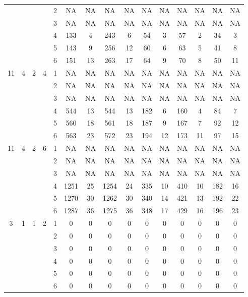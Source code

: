 \begin{longtable}{|c|c|c|c|c|c c|c c|c c|c c|c c|}
 & & & & 2 & NA & NA & NA & NA & NA & NA & NA & NA & NA & NA \\
 & & & & 3 & NA & NA & NA & NA & NA & NA & NA & NA & NA & NA \\
 & & & & 4 & 133 & 4 & 243 & 6 & 54 & 3 & 57 & 2 & 34 & 3 \\
 & & & & 5 & 143 & 9 & 256 & 12 & 60 & 6 & 63 & 5 & 41 & 8 \\
 & & & & 6 & 151 & 13 & 263 & 17 & 64 & 9 & 70 & 8 & 50 & 11 \\
\hline
\multirow{6}{*}{11} & \multirow{6}{*}{4} & \multirow{6}{*}{2} & \multirow{6}{*}{4} & 1 & NA & NA & NA & NA & NA & NA & NA & NA & NA & NA \\
 & & & & 2 & NA & NA & NA & NA & NA & NA & NA & NA & NA & NA \\
 & & & & 3 & NA & NA & NA & NA & NA & NA & NA & NA & NA & NA \\
 & & & & 4 & 544 & 13 & 544 & 13 & 182 & 6 & 160 & 4 & 84 & 7 \\
 & & & & 5 & 560 & 18 & 561 & 18 & 187 & 9 & 167 & 7 & 92 & 12 \\
 & & & & 6 & 563 & 23 & 572 & 23 & 194 & 12 & 173 & 11 & 97 & 15 \\
\hline
\multirow{6}{*}{11} & \multirow{6}{*}{4} & \multirow{6}{*}{2} & \multirow{6}{*}{6} & 1 & NA & NA & NA & NA & NA & NA & NA & NA & NA & NA \\
 & & & & 2 & NA & NA & NA & NA & NA & NA & NA & NA & NA & NA \\
 & & & & 3 & NA & NA & NA & NA & NA & NA & NA & NA & NA & NA \\
 & & & & 4 & 1251 & 25 & 1254 & 24 & 335 & 10 & 410 & 10 & 182 & 16 \\
 & & & & 5 & 1270 & 30 & 1262 & 30 & 340 & 14 & 421 & 13 & 192 & 22 \\
 & & & & 6 & 1287 & 36 & 1275 & 36 & 348 & 17 & 429 & 16 & 196 & 23 \\
\hline
\multirow{6}{*}{3} & \multirow{6}{*}{1} & \multirow{6}{*}{1} & \multirow{6}{*}{2} & 1 & 0 & 0 & 0 & 0 & 0 & 0 & 0 & 0 & 0 & 0 \\
 & & & & 2 & 0 & 0 & 0 & 0 & 0 & 0 & 0 & 0 & 0 & 0 \\
 & & & & 3 & 0 & 0 & 0 & 0 & 0 & 0 & 0 & 0 & 0 & 0 \\
 & & & & 4 & 0 & 0 & 0 & 0 & 0 & 0 & 0 & 0 & 0 & 0 \\
 & & & & 5 & 0 & 0 & 0 & 0 & 0 & 0 & 0 & 0 & 0 & 0 \\
 & & & & 6 & 0 & 0 & 0 & 0 & 0 & 0 & 0 & 0 & 0 & 0 \\

\end{longtable}
